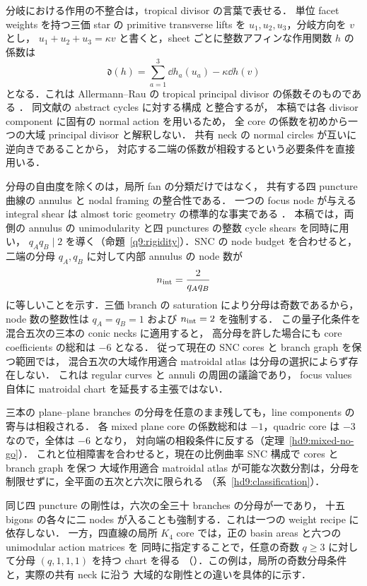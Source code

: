 分岐における作用の不整合は，tropical divisor の言葉で表せる．
単位 facet weights を持つ三価 star の primitive transverse lifts を
$u_1,u_2,u_3$，分岐方向を $v$ とし，
$u_1+u_2+u_3=\kappa v$ と書くと，sheet ごとに整数アフィンな作用関数 $h$ の係数は
\[
 \mathfrak d(h)=\sum_{a=1}^3\dd h_a(u_a)-\kappa\dd h(v)
\]
となる．これは Allermann--Rau の tropical principal divisor の係数そのものである
\cite[Definition~3.4, Remark~3.5]{AllermannRau}．
同文献の abstract cycles に対する構成
\cite[Definition~6.1, Construction~6.4]{AllermannRau}と整合するが，
本稿では各 divisor component に固有の normal action を用いるため，
全 core の係数を初めから一つの大域 principal divisor と解釈しない．
共有 neck の normal circles が互いに逆向きであることから，
対応する二端の係数が相殺するという必要条件を直接用いる．

分母の自由度を除くのは，局所 fan の分類だけではなく，
共有する四 puncture 曲線の annulus と nodal framing の整合性である．
一つの focus node が与える integral shear は almost toric geometry の標準的な事実である
\cite[\S4.3, equation~(4.10)]{SymingtonFour}．
本稿では，両側の annulus の unimodularity と四 punctures の整数 cycle shears を同時に用い，
$q_Aq_B\mid2$ を導く（命題~\ref{q9:rigidity}）．SNC の node budget を合わせると，
二端の分母 $q_A,q_B$ に対して内部 annulus の node 数が
\[
 n_{\rm int}=\frac{2}{q_Aq_B}
\]
に等しいことを示す．三価 branch の saturation により分母は奇数であるから，
node 数の整数性は $q_A=q_B=1$ および $n_{\rm int}=2$ を強制する．
この量子化条件を混合五次の三本の conic necks に適用すると，
高分母を許した場合にも core coefficients の総和は $-6$ となる．
従って現在の SNC cores と branch graph を保つ範囲では，
混合五次の大域作用適合 matroidal atlas は分母の選択によらず存在しない．
これは regular curves と annuli の周囲の議論であり，
focus values 自体に matroidal chart を延長する主張ではない．

三本の plane--plane branches の分母を任意のまま残しても，line components の寄与は相殺される．
各 mixed plane core の係数総和は $-1$，quadric core は $-3$ なので，全体は $-6$ となり，
対向端の相殺条件に反する（定理~\ref{hd9:mixed-no-go}）．
これと位相障害を合わせると，現在の比例曲率 SNC 構成で cores と branch graph を保つ
大域作用適合 matroidal atlas が可能な次数分割は，分母を制限せずに，全平面の五次と六次に限られる
（系~\ref{hd9:classification}）．

同じ四 puncture の剛性は，六次の全三十 branches の分母が一であり，
十五 bigons の各々に二 nodes が入ることも強制する．これは一つの weight recipe に依存しない．
一方，四直線の局所 $K_4$ core では，正の basin areas と六つの unimodular action matrices を
同時に指定することで，任意の奇数 $q\ge3$ に対して分母 $(q,1,1,1)$ を持つ chart を得る
（\cite{QuinticArithmetic}）．この例は，局所の奇数分母条件と，実際の共有 neck に沿う
大域的な剛性との違いを具体的に示す．

